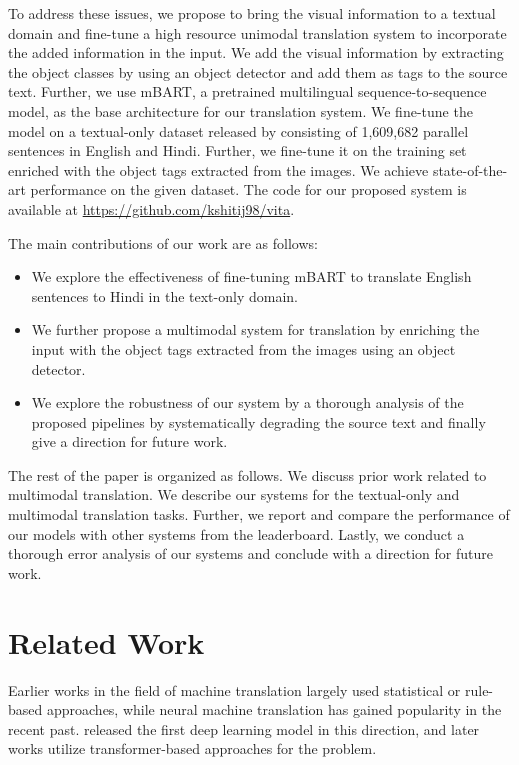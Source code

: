 \documentclass[11pt,a4paper]{article}
\begin{document}
To address these issues, we propose to bring the visual information to a textual domain and fine-tune a high resource unimodal translation system to incorporate the added information in the input. We add the visual information by extracting the object classes by using an object detector and add them as tags to the source text. Further, we use mBART, a pretrained multilingual sequence-to-sequence model, as the base architecture for our translation system. We fine-tune the model on a textual-only dataset released by \citet{kunchukuttan-etal-2018-iit} consisting of 1,609,682 parallel sentences in English and Hindi. Further, we fine-tune it on the training set enriched with the object tags extracted from the images. We achieve state-of-the-art performance on the given dataset. The code for our proposed system is available at \url{https://github.com/kshitij98/vita}.

The main contributions of our work are as follows:

\begin{itemize}
    \item We explore the effectiveness of fine-tuning mBART to translate English sentences to Hindi in the text-only domain.
    \item We further propose a multimodal system for translation by enriching the input with the object tags extracted from the images using an object detector.
    \item We explore the robustness of our system by a thorough analysis of the proposed pipelines by systematically degrading the source text and finally give a direction for future work.
\end{itemize}

The rest of the paper is organized as follows. 
We discuss prior work related to multimodal translation.
We describe our systems for the textual-only and multimodal translation tasks.
Further, we report and compare the performance of our models with other systems from the leaderboard.
Lastly, we conduct a thorough error analysis of our systems and conclude with a direction for future work.

\section{Related Work}

Earlier works in the field of machine translation largely used statistical or rule-based approaches, while neural machine translation has gained popularity in the recent past. \citet{kalchbrenner-blunsom-2013-recurrent} released the first deep learning model in this direction, and later works utilize transformer-based approaches \citep{NIPS2017_3f5ee243, song2019mass, lample2019cross, edunov-etal-2019-pre,  liu2020multilingual} for the problem.
\end{document}
